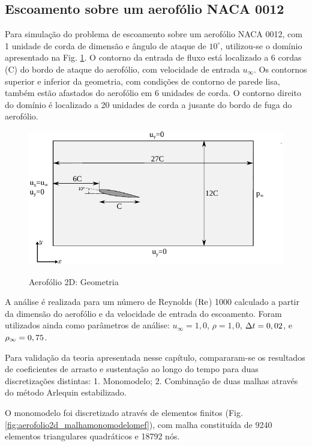 \documentclass[tese_patricia]{subfiles}
\begin{document}
\subsection{Escoamento sobre um aerofólio NACA 0012} \label{subsec:EX1NACA0012}

Para simulação do problema de escoamento sobre um aerofólio NACA 0012, com 1 unidade de corda de dimensão e ângulo de ataque de $10^{\circ}$, utilizou-se o domínio apresentado na Fig. \ref{fig:aerofolio2d_geometria}. O contorno da entrada de fluxo está localizado a 6 cordas (C) do bordo de ataque do aerofólio, com velocidade de entrada $u_\infty$. Os contornos superior e inferior da geometria, com condições de contorno de parede lisa, também estão afastados do aerofólio em 6 unidades de corda. O contorno direito do domínio é localizado a 20 unidades de corda a jusante do bordo de fuga do aerofólio. 

\begin{figure}[htb!]
	\centering 
	{\includegraphics[scale=1.0,trim=0cm 0cm 0cm 0cm, clip=true]{Imagens/Cap6/aerofolio.pdf}}	
	\caption{Aerofólio 2D: Geometria}
	\label{fig:aerofolio2d_geometria}
\end{figure}

A análise é realizada para um número de Reynolds ($\mathrm{Re}$) 1000 calculado a partir da dimensão do aerofólio e da velocidade de entrada do escoamento. Foram utilizados ainda como parâmetros de análise: $u_{\infty} = 1,0$,  $\rho = 1,0$,  $\Delta t = 0,02$, e $\rho_\infty = 0,75$.

Para validação da teoria apresentada nesse capítulo, compararam-se os resultados de coeficientes de arrasto e sustentação ao longo do tempo para duas discretizações distintas: 1. Monomodelo; 2. Combinação de duas malhas através do método Arlequin estabilizado.

O monomodelo foi discretizado através de elementos finitos (Fig. \ref{fig:aerofolio2d_malhamonomodelomef}), com malha constituída de 9240 elementos triangulares quadráticos e 18792 nós. 
\end{document}
